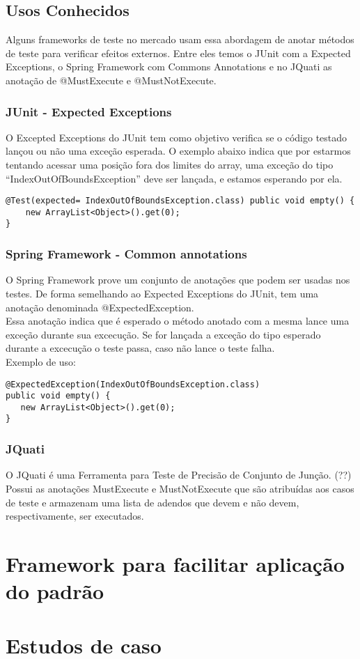 \documentclass[12pt,a4paper,oneside]{book}
\begin{document}
\section{Usos Conhecidos}
Alguns frameworks de teste no mercado usam essa abordagem de anotar métodos de teste para verificar efeitos externos. Entre eles temos o JUnit com a Expected Exceptions, o Spring Framework com Commons Annotations e no JQuati as anotação de @MustExecute e @MustNotExecute.

\subsection{JUnit - Expected Exceptions}
O Excepted Exceptions do JUnit tem como objetivo verifica se o código testado lançou ou não uma exceção esperada.
O exemplo abaixo indica que por estarmos tentando acessar uma posição fora dos limites do array, uma exceção do tipo ``IndexOutOfBoundsException'' deve ser lançada, e estamos esperando por ela.
\begin{verbatim}
@Test(expected= IndexOutOfBoundsException.class) public void empty() { 
    new ArrayList<Object>().get(0); 
}
\end{verbatim}

\subsection{Spring Framework - Common annotations}
O Spring Framework prove um conjunto de anotações que podem ser usadas nos testes. De forma semelhando ao Expected Exceptions do JUnit, tem uma anotação denominada @ExpectedException. \\
Essa anotação indica que é esperado o método anotado com a mesma lance uma exceção durante sua excecução. Se for lançada a exceção do tipo esperado durante a excecução o teste passa, caso não lance o teste falha.\\
Exemplo de uso:
\begin{verbatim}
@ExpectedException(IndexOutOfBoundsException.class)
public void empty() {
   new ArrayList<Object>().get(0);
}
\end{verbatim}

\subsection{JQuati}
O JQuati é uma Ferramenta para Teste de Precisão de Conjunto de Junção. (??) Possui as anotações MustExecute e MustNotExecute que são atribuídas aos casos de teste e armazenam uma lista de adendos que devem e não devem, respectivamente, ser executados.



\chapter{Framework para facilitar aplicação do padrão}

\chapter{Estudos de caso}
\end{document}
